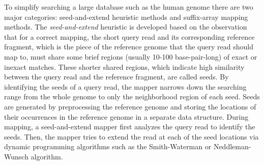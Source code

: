 To simplify searching a large database such as the human genome there are two major categories: seed-and-extend heuristic methods and suffix-array mapping methods. The \emph{seed-and-extend} heuristic is developed based on the observation that for a correct mapping, the short query read and its corresponding reference fragment, which is the piece of the reference genome that the query read should map to, must share some brief regions (usually 10-100 base-pair-long) of exact or inexact matches. These shorter shared regions, which indicate high similarity between the query read and the reference fragment, are called seeds. By identifying the seeds of a query read, the mapper narrows down the searching range from the whole genome to only the neighborhood region of each seed. Seeds are generated by preprocessing the reference genome and storing the locations of their occurrences in the reference genome in a separate data structure. During mapping, a seed-and-extend mapper first analyzes the query read to identify the seeds. Then, the mapper tries to extend the read at each of the seed locations via dynamic programming algorithms such as the Smith-Waterman \cite{smith1981identification} or Neddleman-Wunsch \cite{needleman} algorithm.
  